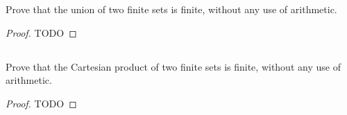 \documentclass{report}
\begin{document}
  Prove that the union of two finite sets is finite, without any use of
    arithmetic.

  \begin{proof}
    TODO
  \end{proof}

\subsection{}%

  Prove that the Cartesian product of two finite sets is finite, without any use
    of arithmetic.

  \begin{proof}
    TODO
  \end{proof}
\end{document}
